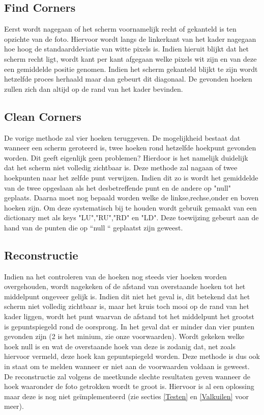 \subsection{Find Corners}
Eerst wordt nagegaan of het scherm voornamelijk recht of gekanteld is ten opzichte van de foto. Hiervoor wordt langs de linkerkant van het kader nagegaan hoe hoog de standaarddeviatie van witte pixels is. Indien hieruit blijkt dat het scherm recht ligt, wordt kant per kant afgegaan welke pixels wit zijn en van deze een gemiddelde positie genomen. Indien het scherm gekanteld blijkt te zijn wordt hetzelfde proces herhaald maar dan gebeurt dit diagonaal. De gevonden hoeken zullen zich dan altijd op de rand van het kader bevinden. 

\subsection{Clean Corners}
De vorige methode zal vier hoeken teruggeven. De mogelijkheid bestaat dat wanneer een scherm geroteerd is, twee hoeken rond hetzelfde hoekpunt gevonden worden. Dit geeft eigenlijk geen problemen? Hierdoor is het namelijk duidelijk dat het scherm niet volledig zichtbaar is. Deze methode zal nagaan of twee hoekpunten naar het zelfde punt verwijzen. Indien dit zo is wordt het gemiddelde van de twee opgeslaan als het desbetreffende punt en de andere op "null" geplaats. Daarna moet nog bepaald worden welke de linkse,rechse,onder en boven hoeken zijn. Om deze systematisch bij te houden wordt gebruik gemaakt van een dictionary met als keys "LU","RU","RD"  \space en "LD". Deze toewijzing gebeurt aan de hand van de punten die op ``null `` geplaatst zijn geweest.

\subsection{Reconstructie} \label{reconstructie}
Indien na het controleren van de hoeken nog steeds vier hoeken worden overgehouden, wordt nagekeken of de afstand van overstaande hoeken tot het middelpunt ongeveer gelijk is. Indien dit niet het geval is, dit betekend dat het scherm niet volledig zichtbaar is, maar het kruis toch mooi op de rand van het kader liggen, wordt het punt waarvan de afstand tot het middelpunt het grootst is gepuntspiegeld rond de oorsprong.
In het geval dat er minder dan vier punten gevonden zijn (2 is het minium, zie onze voorwaarden). Wordt gekeken welke hoek null is en wat  de overstaande hoek van deze is zodanig dat, net zoals hiervoor vermeld, deze hoek kan gepuntspiegeld worden. Deze methode is dus ook in staat om te melden wanneer er niet aan de voorwaarden voldaan is geweest. De reconstructie zal volgens de meetkunde slechte resultaten geven wanneer de hoek waaronder de foto getrokken wordt te groot is. Hiervoor is al een oplossing maar deze is nog niet geïmplementeerd (zie secties \ref{Testen} en \ref{Valkuilen} voor meer).

